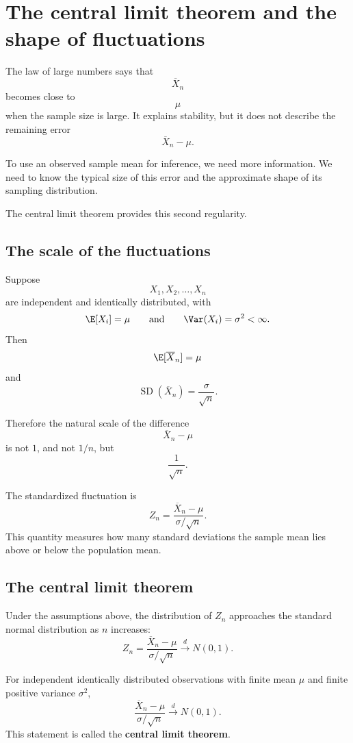 \section{The central limit theorem and the shape of fluctuations}

The law of large numbers says that
\[
\overline X_n
\]
becomes close to
\[
\mu
\]
when the sample size is large. It explains stability, but it does not describe the
remaining error
\[
\overline X_n-\mu.
\]

To use an observed sample mean for inference, we need more information. We need
to know the typical size of this error and the approximate shape of its sampling
distribution.

The central limit theorem provides this second regularity.

\subsection*{The scale of the fluctuations}

Suppose
\[
X_1,X_2,\ldots,X_n
\]
are independent and identically distributed, with
\[
\E[X_i]=\mu
\qquad\text{and}\qquad
\Var(X_i)=\sigma^2<\infty.
\]
Then
\[
\E[\overline X_n]=\mu
\]
and
\[
\operatorname{SD}(\overline X_n)=\frac{\sigma}{\sqrt n}.
\]

Therefore the natural scale of the difference
\[
\overline X_n-\mu
\]
is not \(1\), and not \(1/n\), but
\[
\frac1{\sqrt n}.
\]

The standardized fluctuation is
\[
Z_n
=
\frac{\overline X_n-\mu}{\sigma/\sqrt n}.
\]
This quantity measures how many standard deviations the sample mean lies above
or below the population mean.

\subsection*{The central limit theorem}

Under the assumptions above, the distribution of \(Z_n\) approaches the standard
normal distribution as \(n\) increases:
\[
Z_n
=
\frac{\overline X_n-\mu}{\sigma/\sqrt n}
\xrightarrow{d}
N(0,1).
\]

\begin{theorembox}
For independent identically distributed observations with finite mean \(\mu\) and
finite positive variance \(\sigma^2\),
\[
\frac{\overline X_n-\mu}{\sigma/\sqrt n}
\xrightarrow{d}N(0,1).
\]
This statement is called the \textbf{central limit theorem}.
\end{theorembox}

